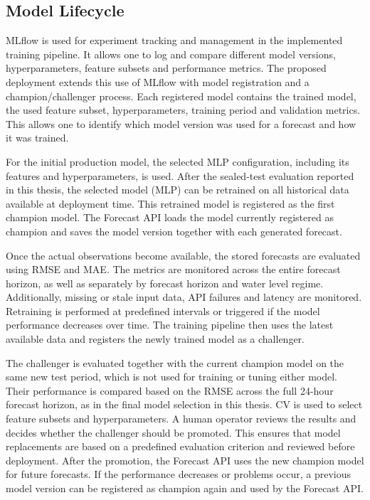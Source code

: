 \subsection{Model Lifecycle}
MLflow is used for experiment tracking and management in the implemented training pipeline. It allows one to log and compare different model versions, hyperparameters, feature subsets and performance metrics. The proposed deployment extends this use of MLflow with model registration and a champion/challenger process. Each registered model contains the trained model, the used feature subset, hyperparameters, training period and validation metrics. This allows one to identify which model version was used for a forecast and how it was trained.

For the initial production model, the selected \ac{MLP} configuration, including its features and hyperparameters, is used. After the sealed-test evaluation reported in this thesis, the selected model (\ac{MLP}) can be retrained on all historical data available at deployment time. This retrained model is registered as the first champion model. The Forecast API loads the model currently registered as champion and saves the model version together with each generated forecast.

Once the actual observations become available, the stored forecasts are evaluated using \ac{RMSE} and \ac{MAE}. The metrics are monitored across the entire forecast horizon, as well as separately by forecast horizon and water level regime. Additionally, missing or stale input data, API failures and latency are monitored. Retraining is performed at predefined intervals or triggered if the model performance decreases over time. The training pipeline then uses the latest available data and registers the newly trained model as a challenger.

The challenger is evaluated together with the current champion model on the same new test period, which is not used for training or tuning either model. Their performance is compared based on the \ac{RMSE} across the full 24-hour forecast horizon, as in the final model selection in this thesis. \ac{CV} is used to select feature subsets and hyperparameters. A human operator reviews the results and decides whether the challenger should be promoted. This ensures that model replacements are based on a predefined evaluation criterion and reviewed before deployment. After the promotion, the Forecast API uses the new champion model for future forecasts. If the performance decreases or problems occur, a previous model version can be registered as champion again and used by the Forecast API.
